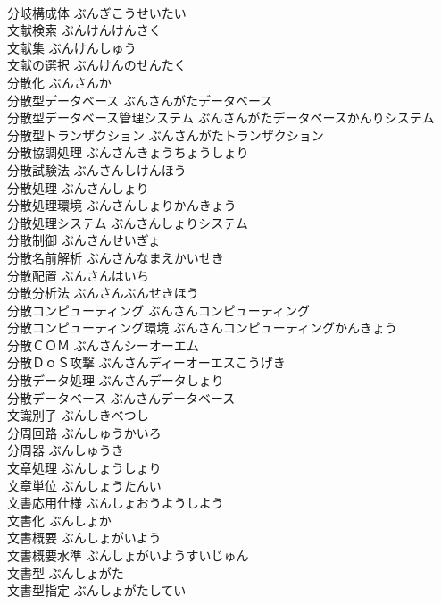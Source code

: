 \documentclass[8pt]{extreport}
\begin{document}
\begin{CJK}{UTF8}{min}
\\	分岐構成体	ぶんぎこうせいたい	
\\	文献検索	ぶんけんけんさく	
\\	文献集	ぶんけんしゅう	
\\	文献の選択	ぶんけんのせんたく	
\\	分散化	ぶんさんか	
\\	分散型データベース	ぶんさんがたデータベース	
\\	分散型データベース管理システム	ぶんさんがたデータベースかんりシステム	
\\	分散型トランザクション	ぶんさんがたトランザクション	
\\	分散協調処理	ぶんさんきょうちょうしょり	
\\	分散試験法	ぶんさんしけんほう	
\\	分散処理	ぶんさんしょり	
\\	分散処理環境	ぶんさんしょりかんきょう	
\\	分散処理システム	ぶんさんしょりシステム	
\\	分散制御	ぶんさんせいぎょ	
\\	分散名前解析	ぶんさんなまえかいせき	
\\	分散配置	ぶんさんはいち	
\\	分散分析法	ぶんさんぶんせきほう	
\\	分散コンピューティング	ぶんさんコンピューティング	
\\	分散コンピューティング環境	ぶんさんコンピューティングかんきょう	
\\	分散ＣＯＭ	ぶんさんシーオーエム	
\\	分散ＤｏＳ攻撃	ぶんさんディーオーエスこうげき	
\\	分散データ処理	ぶんさんデータしょり	
\\	分散データベース	ぶんさんデータベース	
\\	文識別子	ぶんしきべつし	
\\	分周回路	ぶんしゅうかいろ	
\\	分周器	ぶんしゅうき	
\\	文章処理	ぶんしょうしょり	
\\	文章単位	ぶんしょうたんい	
\\	文書応用仕様	ぶんしょおうようしよう	
\\	文書化	ぶんしょか	
\\	文書概要	ぶんしょがいよう	
\\	文書概要水準	ぶんしょがいようすいじゅん	
\\	文書型	ぶんしょがた	
\\	文書型指定	ぶんしょがたしてい	

\end{CJK}
\end{document}

